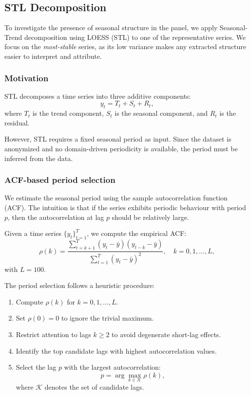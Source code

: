 \subsection{STL Decomposition}
\label{sec:eda:stl}

To investigate the presence of seasonal structure in the panel, we apply Seasonal-Trend decomposition using LOESS (STL) to one of the representative series. We focus on the \emph{most-stable} series, as its low variance makes any extracted structure easier to interpret and attribute.

\subsubsection{Motivation}

STL decomposes a time series into three additive components:
\begin{equation}
y_t = T_t + S_t + R_t,
\end{equation}
where $T_t$ is the trend component, $S_t$ is the seasonal component, and $R_t$ is the residual.

However, STL requires a fixed seasonal period as input. Since the dataset is anonymized and no domain-driven periodicity is available, the period must be inferred from the data.

\subsubsection{ACF-based period selection}
\label{sec:eda:stl_period}

We estimate the seasonal period using the sample autocorrelation function (ACF). The intuition is that if the series exhibits periodic behaviour with period $p$, then the autocorrelation at lag $p$ should be relatively large.

Given a time series $\{y_t\}_{t=1}^{T}$, we compute the empirical ACF:
\begin{equation}
\rho(k) = \frac{\sum_{t=k+1}^{T} (y_t - \bar{y})(y_{t-k} - \bar{y})}{\sum_{t=1}^{T} (y_t - \bar{y})^2}, \quad k = 0, 1, \dots, L,
\end{equation}
with $L = 100$.

The period selection follows a heuristic procedure:

\begin{enumerate}
    \item Compute $\rho(k)$ for $k = 0, 1, \dots, L$.
    \item Set $\rho(0) = 0$ to ignore the trivial maximum.
    \item Restrict attention to lags $k \geq 2$ to avoid degenerate short-lag effects.
    \item Identify the top candidate lags with highest autocorrelation values.
    \item Select the lag $p$ with the largest autocorrelation:
    \begin{equation}
        p = \arg\max_{k \in \mathcal{K}} \rho(k),
    \end{equation}
    where $\mathcal{K}$ denotes the set of candidate lags.
\end{enumerate}

